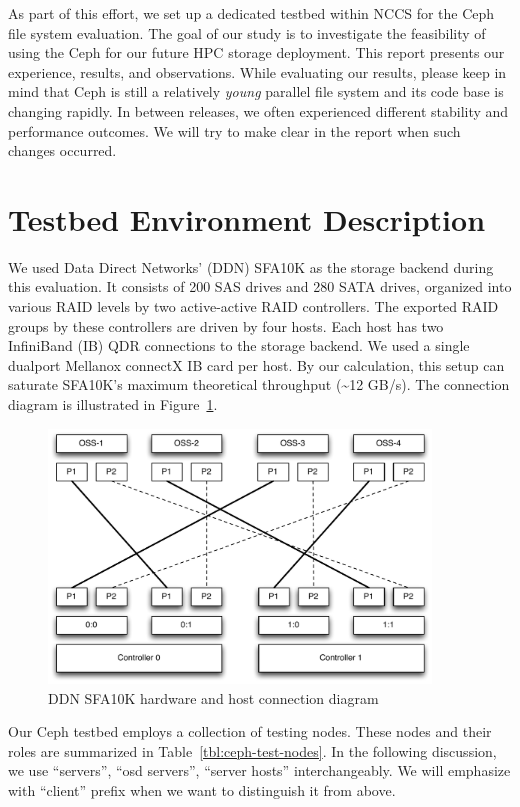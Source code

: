 \documentclass{article}
\begin{document}
As part of this effort, we set up a dedicated testbed within NCCS for the Ceph
file system evaluation. The goal of our study is to investigate the
feasibility of using the Ceph for our future HPC storage deployment.  This
report presents our experience, results, and observations. While evaluating
our results, please keep in mind that Ceph is still a relatively
\textit{young} parallel file system and its code base is changing rapidly. In
between releases, we often experienced different stability and performance
outcomes.  We will try to make clear in the report when such changes occurred.

\section{Testbed Environment Description}

We used Data Direct Networks' (DDN) SFA10K as the storage backend during this
evaluation. It consists of 200 SAS drives and 280 SATA drives, organized into
various RAID levels by two active-active RAID controllers. The exported RAID
groups by these controllers are driven by four hosts.
Each host has two InfiniBand (IB) QDR connections to the storage backend.
We used a single dualport Mellanox connectX IB card per host.
By our calculation, this setup can saturate SFA10K's maximum theoretical
throughput (\textasciitilde 12 GB/s). The connection diagram is illustrated in
Figure~\ref{fig:ddn-sfa10k}.

\begin{figure}[htb]
\centering
\includegraphics[width=4in]{figs/sfa10k}
\caption{DDN SFA10K hardware and host connection diagram}
\label{fig:ddn-sfa10k}
\end{figure}


Our Ceph testbed employs a collection of testing nodes. These nodes and their
roles are summarized in Table~\ref{tbl:ceph-test-nodes}. In the following
discussion, we use ``servers'', ``osd servers'', ``server hosts''
interchangeably. We will emphasize with ``client'' prefix when we want to
distinguish it from above.
\end{document}
